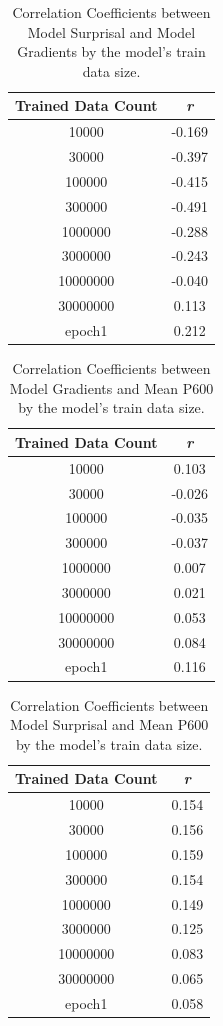 \documentclass{IEEEtran}
\begin{document}
\begin{table}
    \centering
    \begin{tabular}{c|c}
        \textbf{Trained Data Count} & \textbf{\textit{r}} \\
        \hline
        10000&-0.169\\
        30000&-0.397\\
        100000&-0.415\\
        300000&-0.491\\
        1000000&-0.288\\
        3000000&-0.243\\
        10000000&-0.040\\
        30000000&0.113\\
        epoch1&0.212
    \end{tabular}
    \caption{Correlation Coefficients between Model Surprisal and Model Gradients by the model's train data size.}
    \label{tab:correlation_surprisal_gradients}
\end{table}
\begin{table}
    \centering
    \begin{tabular}{c|c}
        \textbf{Trained Data Count} & \textbf{\textit{r}} \\
        \hline
        10000&0.103\\
        30000&-0.026\\
        100000&-0.035\\
        300000&-0.037\\
        1000000&0.007\\
        3000000&0.021\\
        10000000&0.053\\
        30000000&0.084\\
        epoch1&0.116
    \end{tabular}
    \caption{Correlation Coefficients between Model Gradients and Mean P600 by the model's train data size.}
    \label{tab:correlation_gradients_p600}
\end{table}
\begin{table}
    \centering
    \begin{tabular}{c|c}
        \textbf{Trained Data Count} & \textbf{\textit{r}} \\
        \hline
        10000&0.154\\
        30000&0.156\\
        100000&0.159\\
        300000&0.154\\
        1000000&0.149\\
        3000000&0.125\\
        10000000&0.083\\
        30000000&0.065\\
        epoch1&0.058
    \end{tabular}
    \caption{Correlation Coefficients between Model Surprisal and Mean P600 by the model's train data size.}
    \label{tab:correlation_surprisal_p600}
\end{table}
\end{document}
